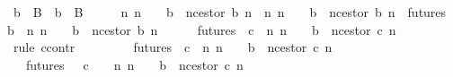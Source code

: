 \begin{isabellebody}
\ {\isachardoublequoteopen}b{}\ {\isasymin}\ B\ {\isasymand}\ b{}\ {\isasymin}\ B\ {\isasymand}\ {\isasymsigma}\ {\isasymin}\ {\isasymSigma}{\isachardoublequoteclose}\ \ {\isachardoublequoteopen}{\isacharparenleft}{\isasymforall}n{\isachardot}\ n\ {\isasymin}\ {\isasymnat}\ {\isasymlongrightarrow}\ b{}\ {\isasymnoteq}\ n{\isacharunderscore}cestor\ {\isacharparenleft}b{}{\isacharcomma}\ n{\isacharparenright}{\isacharparenright}\ {\isasymand}\ {\isacharparenleft}{\isasymforall}n{\isachardot}\ n\ {\isasymin}\ {\isasymnat}\ {\isasymlongrightarrow}\ b{}\ {\isasymnoteq}\ n{\isacharunderscore}cestor\ {\isacharparenleft}b{}{\isacharcomma}\ n{\isacharparenright}{\isacharparenright}{\isachardoublequoteclose}\ \ {\isachardoublequoteopen}{\isasymforall}{\isasymsigma}{\isasymin}futures\ {\isasymsigma}{\isachardot}\ {\isasymforall}b{\isacharprime}{\isasymin}{\isasymepsilon}\ {\isasymsigma}{\isachardot}\ {\isasymexists}n{\isachardot}\ n\ {\isasymin}\ {\isasymnat}\ {\isasymand}\ b{}\ {\isacharequal}\ n{\isacharunderscore}cestor\ {\isacharparenleft}b{\isacharprime}{\isacharcomma}\ n{\isacharparenright}{\isachardoublequoteclose}\ \isanewline
\ \ \isamarkupfalse%
\ \ {\isachardoublequoteopen}{\isasymforall}{\isasymsigma}{\isasymin}futures\ {\isasymsigma}{\isachardot}\ {\isasymforall}c{\isasymin}{\isasymepsilon}\ {\isasymsigma}{\isachardot}\ {\isasymforall}n{\isachardot}\ n\ {\isasymin}\ {\isasymnat}\ {\isasymlongrightarrow}\ b{}\ {\isasymnoteq}\ n{\isacharunderscore}cestor\ {\isacharparenleft}c{\isacharcomma}\ n{\isacharparenright}{\isachardoublequoteclose}\isanewline
\ \ \isamarkupfalse%
\ {\isacharparenleft}rule\ ccontr{\isacharparenright}\isanewline
\ \ \ \ \isamarkupfalse%
\ {\isachardoublequoteopen}{\isasymnot}\ {\isacharparenleft}{\isasymforall}\ {\isasymsigma}\ {\isasymin}futures\ {\isasymsigma}{\isachardot}\ {\isasymforall}c{\isasymin}{\isasymepsilon}\ {\isasymsigma}{\isachardot}\ {\isasymforall}n{\isachardot}\ n\ {\isasymin}\ {\isasymnat}\ {\isasymlongrightarrow}\ b{}\ {\isasymnoteq}\ n{\isacharunderscore}cestor\ {\isacharparenleft}c{\isacharcomma}\ n{\isacharparenright}{\isacharparenright}{\isachardoublequoteclose}\isanewline
\ \ \ \ \isamarkupfalse%
\ {\isachardoublequoteopen}{\isasymexists}\ {\isasymsigma}\ {\isasymin}futures\ {\isasymsigma}{\isachardot}\ {\isasymexists}\ c\ {\isasymin}\ {\isasymepsilon}\ {\isasymsigma}{\isachardot}\ {\isasymexists}n{\isachardot}\ n\ {\isasymin}\ {\isasymnat}\ {\isasymand}\ b{}\ {\isacharequal}\ n{\isacharunderscore}cestor\ {\isacharparenleft}c{\isacharcomma}\ n{\isacharparenright}{\isachardoublequoteclose}\isanewline

\end{isabellebody}
